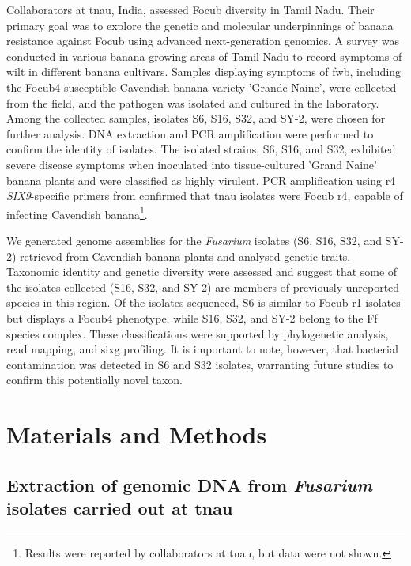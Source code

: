 Collaborators at \ac{tnau}, India, assessed \ac{Focub} diversity in Tamil Nadu. Their primary goal was to explore the genetic and molecular underpinnings of banana resistance against \ac{Focub} using advanced next-generation genomics. A survey was conducted in various banana-growing areas of Tamil Nadu to record symptoms of wilt in different banana cultivars. Samples displaying symptoms of \ac{fwb}, including the \ac{Focub4} susceptible Cavendish banana variety 'Grande Naine', were collected from the field, and the pathogen was isolated and cultured in the laboratory. Among the collected samples, isolates S6, S16, S32, and SY-2, were chosen for further analysis. DNA extraction and PCR amplification were performed to confirm the identity of isolates. The isolated strains, S6, S16, and S32, exhibited severe disease symptoms when inoculated into tissue-cultured 'Grand Naine' banana plants and were classified as highly virulent. PCR amplification using \ac{r4} \textit{SIX9}-specific primers from \textcite{Carvalhais2019} confirmed that \ac{tnau} isolates were \ac{Focub} \ac{r4}, capable of infecting Cavendish banana\footnote{Results were reported by collaborators at \ac{tnau}, but data were not shown.}.

We generated genome assemblies for the \textit{Fusarium} isolates  (S6, S16, S32, and SY-2) retrieved from Cavendish banana plants and analysed genetic traits. Taxonomic identity and genetic diversity were assessed and suggest that some of the isolates collected (S16, S32, and SY-2) are members of previously unreported species in this region. Of the isolates sequenced, S6 is similar to \ac{Focub} \ac{r1} isolates but displays a \ac{Focub4} phenotype, while S16, S32, and SY-2 belong to the \acl{Ff} species complex. These classifications were supported by phylogenetic analysis, read mapping, and \ac{sixg} profiling. It is important to note, however, that bacterial contamination was detected in S6 and S32 isolates, warranting future studies to confirm this potentially novel taxon.

\newpage
\section{Materials and Methods}


\subsection{Extraction of genomic DNA from \textit{Fusarium} isolates carried out at \acf{tnau}}

